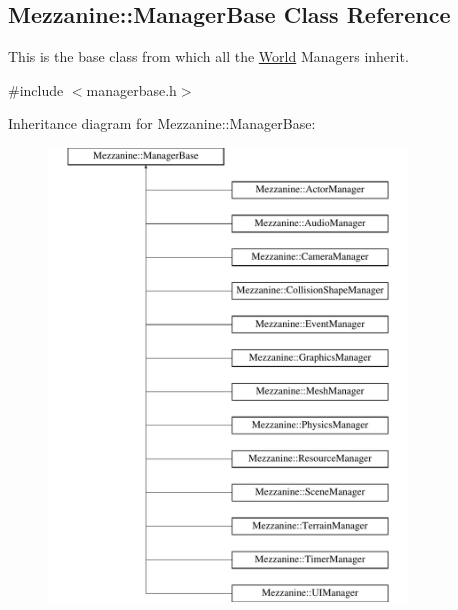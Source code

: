 \hypertarget{classMezzanine_1_1ManagerBase}{
\subsection{Mezzanine::ManagerBase Class Reference}
\label{classMezzanine_1_1ManagerBase}
}


This is the base class from which all the \hyperlink{classMezzanine_1_1World}{World} Managers inherit.  




{\ttfamily \#include $<$managerbase.h$>$}

Inheritance diagram for Mezzanine::ManagerBase:\begin{figure}[H]
\begin{center}
\leavevmode
\includegraphics[height=12.000000cm]{classMezzanine_1_1ManagerBase}
\end{center}
\end{figure}
